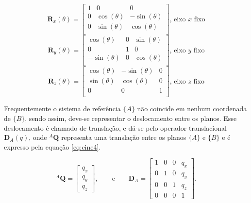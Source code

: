     \begin{equation*}
        \mathbf{R}_x(\theta) =
        \begin{bmatrix}
            1 & 0            & 0             \\
            0 & \cos(\theta) & -\sin(\theta) \\
            0 & \sin(\theta) & \cos(\theta)  \\
        \end{bmatrix} \text{, eixo $x$ fixo}
    \end{equation*}
    \begin{equation*}
        \mathbf{R}_y(\theta) =
        \begin{bmatrix}
            \cos(\theta)  & 0 & \sin(\theta) \\
            0             & 1 & 0            \\
            -\sin(\theta) & 0 & \cos(\theta) \\
        \end{bmatrix} \text{, eixo $y$ fixo}
    \end{equation*}
    \begin{equation*}
        \mathbf{R}_z(\theta) =
        \begin{bmatrix}
            \cos(\theta) & -\sin(\theta) & 0 \\
            \sin(\theta) & \cos(\theta) & 0 \\
            0            & 0            & 1 \\
        \end{bmatrix} \text{, eixo $z$ fixo}
    \end{equation*}

    Frequentemente o sistema de referência $\{A\}$ não coincide em nenhum coordenada de $\{B\}$, sendo assim, deve-se representar o deslocamento entre os planos. Esse deslocamento é chamado de translação, e dá-se pelo operador translacional $\mathbf{D}_A(q)$, onde ${}^A\mathbf{Q}$ representa uma translação entre os planos $\{A\}$ e $\{B\}$ e é expresso pela equação \eqref{eq:cine4}.

    \begin{equation}\label{eq:cine4}
    {}^A\mathbf{Q} =
    \begin{bmatrix}
    q_x\\ q_y \\ q_z
    \end{bmatrix}, \qquad \mathrm{e} \qquad
    \mathbf{D}_A = 
    \begin{bmatrix}
    1 & 0 & 0 & q_x\\
    0 & 1 & 0 & q_y\\
    0 & 0 & 1 & q_z\\
    0 & 0 & 0 & 1
    \end{bmatrix}.
    \end{equation}
    
